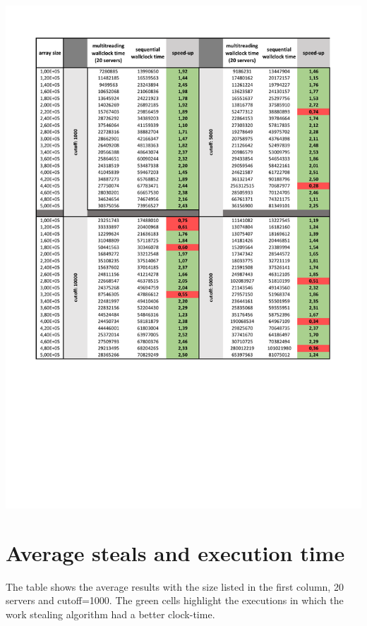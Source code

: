 \documentclass{article}
\begin{document}
\begingroup
\includegraphics[page=1, width=\linewidth]{imgs/CutOff1000-5000.pdf}
\endgroup

\section{Average steals and execution time}
The table shows the average results with the size listed in the first column, 20 servers and cutoff=1000. The green cells highlight the executions in which the work stealing algorithm had a better clock-time.
\end{document}
